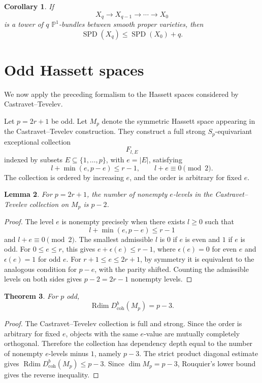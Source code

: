 \documentclass[11pt]{amsart}
\numberwithin{equation}{section}
\newtheorem{theorem}{Theorem}[section]
\newtheorem{lemma}[theorem]{Lemma}
\newtheorem{corollary}[theorem]{Corollary}
\theoremstyle{definition}
\DeclareMathOperator{\Rdim}{Rdim}
\DeclareMathOperator{\SPD}{SPD}
\newcommand{\Db}{D^b_{\mathrm{coh}}}
\begin{document}
\begin{corollary}
If
\[
X_q\to X_{q-1}\to\cdots\to X_0
\]
is a tower of $q$ $\mathbb P^1$-bundles between smooth proper varieties, then
\[
\SPD(X_q)\le \SPD(X_0)+q.
\]
\end{corollary}

\section{Odd Hassett spaces}

We now apply the preceding formalism to the Hassett spaces considered by Castravet--Tevelev.

Let $p=2r+1$ be odd. Let $M_p$ denote the symmetric Hassett space appearing in the Castravet--Tevelev construction. They construct a full strong $S_p$-equivariant exceptional collection
\[
F_{l,E}
\]
indexed by subsets $E\subseteq\{1,\dots,p\}$, with $e=|E|$, satisfying
\[
l+\min(e,p-e)\le r-1,
\qquad
l+e\equiv0\pmod 2.
\]
The collection is ordered by increasing $e$, and the order is arbitrary for fixed $e$.

\begin{lemma}
For $p=2r+1$, the number of nonempty $e$-levels in the Castravet--Tevelev collection on $M_p$ is $p-2$.
\end{lemma}

\begin{proof}
The level $e$ is nonempty precisely when there exists $l\ge0$ such that
\[
l+\min(e,p-e)\le r-1
\]
and $l+e\equiv0\pmod2$. The smallest admissible $l$ is $0$ if $e$ is even and $1$ if $e$ is odd. For $0\le e\le r$, this gives $e+\epsilon(e)\le r-1$, where $\epsilon(e)=0$ for even $e$ and $\epsilon(e)=1$ for odd $e$. For $r+1\le e\le 2r+1$, by symmetry it is equivalent to the analogous condition for $p-e$, with the parity shifted. Counting the admissible levels on both sides gives $p-2=2r-1$ nonempty levels.
\end{proof}

\begin{theorem}
For $p$ odd,
\[
\Rdim \Db(M_p)=p-3.
\]
\end{theorem}

\begin{proof}
The Castravet--Tevelev collection is full and strong. Since the order is arbitrary for fixed $e$, objects with the same $e$-value are mutually completely orthogonal. Therefore the collection has dependency depth equal to the number of nonempty $e$-levels minus $1$, namely $p-3$. The strict product diagonal estimate gives $\Rdim \Db(M_p)\le p-3$. Since $\dim M_p=p-3$, Rouquier's lower bound gives the reverse inequality.
\end{proof}
\end{document}
